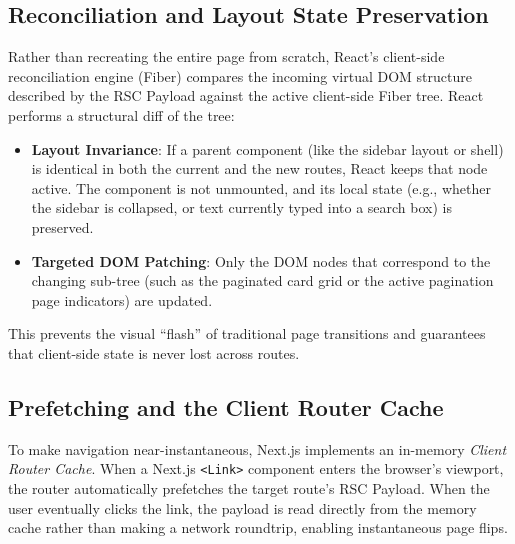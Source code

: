 \subsection{Reconciliation and Layout State Preservation}
Rather than recreating the entire page from scratch, React's client-side reconciliation engine (Fiber) compares the incoming virtual DOM structure described by the RSC Payload against the active client-side Fiber tree. 
React performs a structural diff of the tree:
\begin{itemize}
	\item \textbf{Layout Invariance}: If a parent component (like the sidebar layout or shell) is identical in both the current and the new routes, React keeps that node active. The component is not unmounted, and its local state (e.g., whether the sidebar is collapsed, or text currently typed into a search box) is preserved.
	\item \textbf{Targeted DOM Patching}: Only the DOM nodes that correspond to the changing sub-tree (such as the paginated card grid or the active pagination page indicators) are updated.
\end{itemize}
This prevents the visual ``flash'' of traditional page transitions and guarantees that client-side state is never lost across routes.
\subsection{Prefetching and the Client Router Cache}
To make navigation near-instantaneous, Next.js implements an in-memory \emph{Client Router Cache}. When a Next.js \texttt{<Link>} component enters the browser's viewport, the router automatically prefetches the target route's RSC Payload. When the user eventually clicks the link, the payload is read directly from the memory cache rather than making a network roundtrip, enabling instantaneous page flips.
